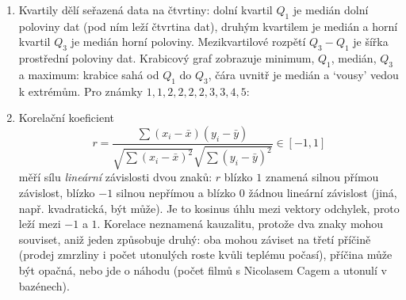 \begin{enumerate}[label=\textbf{\arabic*.}, leftmargin=*, itemsep=0.8em]
  \item {}
  Kvartily dělí seřazená data na čtvrtiny: dolní kvartil $Q_1$ je medián dolní poloviny dat (pod ním leží čtvrtina dat), druhým kvartilem je medián a horní kvartil $Q_3$ je medián horní poloviny. Mezikvartilové rozpětí $Q_3 - Q_1$ je šířka prostřední poloviny dat. Krabicový graf zobrazuje minimum, $Q_1$, medián, $Q_3$ a maximum: krabice sahá od $Q_1$ do $Q_3$, čára uvnitř je medián a `vousy' vedou k extrémům. Pro známky $1, 1, 2, 2, 2, 2, 3, 3, 4, 5$:
  \begin{center}
  \end{center}

  \item {}
  Korelační koeficient
  \begin{equation*}
    r = \frac{\sum(x_i - \bar{x})(y_i - \bar{y})}{\sqrt{\sum{(x_i - \bar{x})}^2}\sqrt{\sum{(y_i - \bar{y})}^2}}\in[-1, 1]
  \end{equation*}
  měří sílu \emph{lineární} závislosti dvou znaků: $r$ blízko $1$ znamená silnou přímou závislost, blízko $-1$ silnou nepřímou a blízko $0$ žádnou lineární závislost (jiná, např. kvadratická, být může). Je to kosinus úhlu mezi vektory odchylek, proto leží mezi $-1$ a $1$. Korelace neznamená kauzalitu, protože dva znaky mohou souviset, aniž jeden způsobuje druhý: oba mohou záviset na třetí příčině (prodej zmrzliny i počet utonulých roste kvůli teplému počasí), příčina může být opačná, nebo jde o náhodu (počet filmů s Nicolasem Cagem a utonulí v bazénech). 
\end{enumerate}

